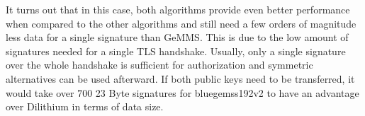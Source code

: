 It turns out that in this case, both algorithms provide even better performance when compared to the other algorithms and still need a few orders of magnitude less data for a single signature than GeMMS. This is due to the low amount of signatures needed for a single TLS handshake. Usually, only a single signature over the whole handshake is sufficient for authorization and symmetric alternatives can be used afterward. If both public keys need to be transferred, it would take over \(700\) 23 Byte signatures for bluegemss192v2 to have an advantage over Dilithium in terms of data size.
\endinput